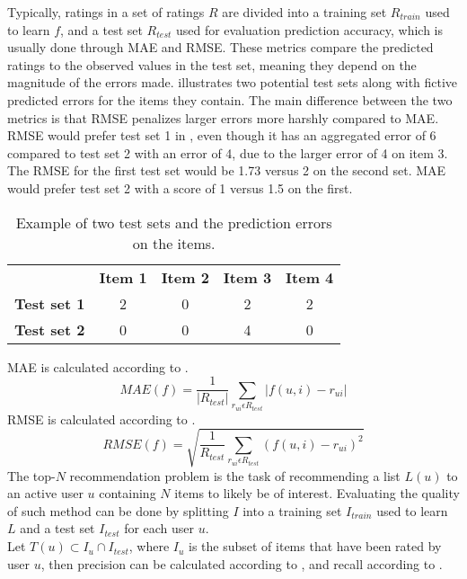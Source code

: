 Typically, ratings in a set of ratings $R$ are divided into a training set $R_{train}$ used to learn $f$, and a test set $R_{test}$ used for evaluation prediction accuracy, which is usually done through MAE and RMSE.
These metrics compare the predicted ratings to the observed values in the test set, meaning they depend on the magnitude of the errors made.
 illustrates two potential test sets along with fictive predicted errors for the items they contain.
The main difference between the two metrics is that RMSE penalizes larger errors more harshly compared to MAE.
RMSE would prefer test set 1 in , even though it has an aggregated error of 6 compared to test set 2 with an error of 4, due to the larger error of 4 on item 3.
The RMSE for the first test set would be 1.73 versus 2 on the second set.
MAE would prefer test set 2 with a score of 1 versus 1.5 on the first.
\begin{table}[]\centering
    \caption{Example of two test sets and the prediction errors on the items.}\label{tab:rmsevsmae}
    \scriptsize
    \begin{tabular}{ccccc}\toprule
        &\textbf{Item 1} & \textbf{Item 2} & \textbf{Item 3} & \textbf{Item 4}\\\cmidrule{1-5}
        \textbf{Test set 1} & 2 & 0 & 2 & 2 \\\cmidrule{1-5}
        \textbf{Test set 2} & 0 & 0 & 4 & 0  \\\cmidrule{1-5}
    \bottomrule
    \end{tabular}
\end{table}
MAE is calculated according to .
\begin{equation}
    \label{eqn:MAE}
    MAE(f) = \frac{1}{|R_{test}|} \sum\limits_{r_{ui} \epsilon R_{test}} |f(u,i)-r_{ui}|
\end{equation}
RMSE is calculated according to .
\begin{equation}
    \label{eqn:RMSE}
    RMSE(f) = \sqrt{\frac{1}{R_{test}} \sum\limits_{r_{ui} \epsilon R_{test}} (f(u, i) - r_{ui})^2}
\end{equation}
The top-$N$ recommendation problem is the task of recommending a list $L(u)$ to an active user $u$ containing $N$ items to likely be of interest.
Evaluating the quality of such method can be done by splitting $I$ into a training set $I_{train}$ used to learn $L$ and a test set $I_{test}$ for each user $u$.
\\
Let $T(u) \subset I_u \cap I_{test}$, where $I_u$ is the subset of items that have been rated by user $u$, then precision can be calculated according to , and recall according to .
